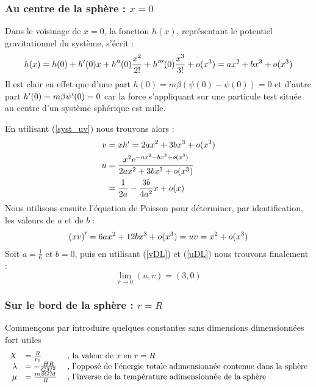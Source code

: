 
\subsubsection{Au centre de la sphère : $x = 0$}
	Dans le voisinage de $x=0$, la fonction $h(x)$, représentant le potentiel gravitationnel du système, s'écrit :
	\begin{align*}
		h(x) = h(0) + h'(0)x + h^{\prime\prime}(0)\frac{x^2}{2!} + h^{\prime\prime\prime}(0)\frac{x^3}{3!} + o(x^3) = ax^2 + bx^3 + o(x^3)
	\end{align*}
	Il est clair en effet que d'une part \mbox{$h(0) = m\beta\left(\psi(0) - \psi(0)\right) = 0$} et d'autre part \mbox{$h'(0) = m\beta\psi'(0) = 0$} car la force s'appliquant sur une particule test située au centre d'un système sphérique est nulle.

	En utilisant (\ref{syst_uv}) nous trouvons alors :
	\begin{align}
		v &= xh' = 2ax^2 + 3bx^3 + o(x^3)\label{vDL} \\
		u &= \frac{x^2e^{-ax^2 - bx^3 + o(x^3)}}{2ax^2 + 3bx^3 + o(x^3)} \\
		  &= \frac{1}{2a} - \frac{3b}{4a^2}x + o(x)\label{uDL}
	\end{align}
	Nous utilisons ensuite l'équation de Poisson pour déterminer, par identification, les valeurs de $a$ et de $b$ :
	\begin{align}
		\left(xv\right)' = 6ax^2 + 12bx^3 + o(x^3) = uv = x^2 + o(x^3)\label{PoisDL}
	\end{align}
	Soit $a = \frac{1}{6}$ et $b=0$, puis en utilisant (\ref{vDL}) et (\ref{uDL}) nous trouvons finalement :
	$$\lim_{r\to 0}(u,v) = (3,0)$$

\subsubsection{Sur le bord de la sphère : $r = R$}
	Commençons par introduire quelques constantes sans dimensions dimensionnées fort utiles 
	\begin{align}
		\begin{array}{rll}
		X &= \frac{R}{r_0}\;   &\textrm{, la valeur de }x\textrm{ en }r=R \\
		\lambda &= - \frac{H R}{G M^2}\;   &\textrm{, l'opposé de l'énergie totale adimensionnée contenue dans la sphère}\\
		\mu &= \frac{m\beta GM}{R}\;    &\textrm{, l'inverse de la température adimensionnée de la sphère}
		\end{array} \notag
	\end{align}
	
